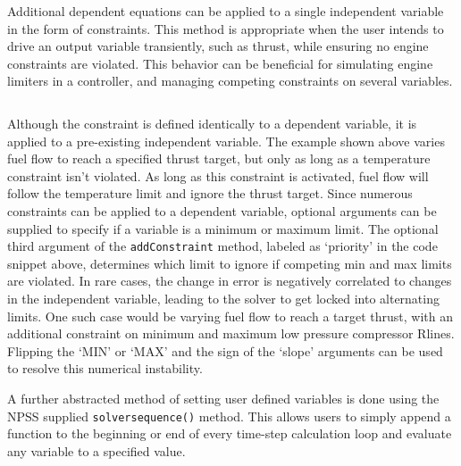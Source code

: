 \documentclass[heading.tex]{subfiles}
\begin{document}
 \begin{adjustwidth}{1cm}{-1cm}
 \inputminted[]{c++}{code/solverSetup}
 \end{adjustwidth} 


Additional dependent equations can be applied to a single independent variable in the form of constraints.
This method is appropriate when the user intends to drive an output variable transiently,
such as thrust, while ensuring no engine constraints are violated.
This behavior can be beneficial for simulating engine limiters in a controller, and managing 
competing constraints on several variables.
 
 \begin{adjustwidth}{1cm}{-1cm}
 \inputminted[]{c++}{code/constraintSetup}
 \end{adjustwidth} 
 
Although the constraint is defined identically to a dependent variable, it is applied to a pre-existing independent variable.
The example shown above varies fuel flow to reach a specified thrust target, but only as long as a temperature constraint isn't violated.
As long as this constraint is activated, fuel flow will follow the temperature limit and ignore the thrust target.
Since numerous constraints can be applied to a dependent variable,
optional arguments can be supplied to specify if a variable is a minimum or maximum limit.
The optional third argument of the \texttt{addConstraint} method, labeled as `priority' in the code snippet above,
determines which limit to ignore if competing min and max limits are violated.
In rare cases, the change in error is negatively correlated to changes in the independent variable,
leading to the solver to get locked into alternating limits. One such case would be varying fuel flow to reach a target thrust,
with an additional constraint on minimum and maximum low pressure compressor Rlines.
Flipping the `MIN' or `MAX' and the sign of the `slope' arguments can be used to resolve this numerical instability.

A further abstracted method of setting user defined variables is done using the NPSS supplied \texttt{solversequence()} method.
This allows users to simply append a function to the beginning or end of every time-step calculation loop
and evaluate any variable to a specified value. 
 
 \begin{adjustwidth}{-1cm}{-1cm}
 \inputminted[]{c++}{code/solverSequence}
 \end{adjustwidth} 
 
\end{document}
